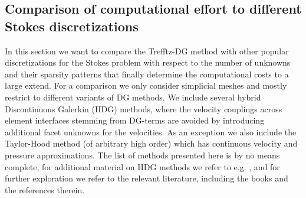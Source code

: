 \documentclass[pdflatex,sn-mathphys,Numbered]{sn-jnl}%
\theoremstyle{remark}%
\theoremstyle{definition}%
\begin{document}
\subsection{Comparison of computational effort to different Stokes discretizations} \label{sec:numbercrunching}

In this section we want to compare the Trefftz-DG method with other popular discretizations for the Stokes problem with respect to the number of unknowns and their sparsity patterns that finally determine the computational costs to a large extend.
For a comparison we only consider simplicial meshes and mostly restrict to different variants of DG methods.
We include several hybrid Discontinuous Galerkin (HDG) methods, where the velocity couplings across element interfaces stemming from DG-terms are avoided by introducing additional facet unknowns for the velocities.
As an exception we also include the Taylor-Hood method (of arbitrary high order) which has continuous velocity and pressure approximations.
The list of methods presented here is by no means complete, for additional material on HDG methods we refer to e.g. \cite{zbMATH05837531,COCKBURN2014221,L_MTH_2010}, and for further exploration we refer to the relevant literature, including the books \cite{di2011mathematical,brezzi,zbMATH06625569} and the references therein.
\end{document}
